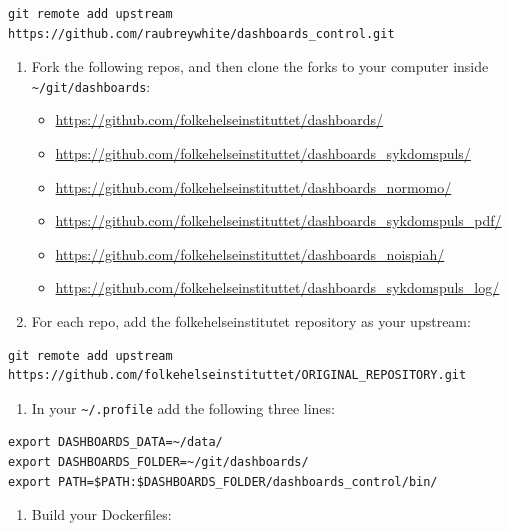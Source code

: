 \documentclass[12pt,]{article}
\providecommand{\tightlist}{%
  \setlength{\itemsep}{0pt}\setlength{\parskip}{0pt}}
\begin{document}
\begin{verbatim}
git remote add upstream https://github.com/raubreywhite/dashboards_control.git
\end{verbatim}

\begin{enumerate}
\def\labelenumi{\arabic{enumi}.}
\setcounter{enumi}{4}
\tightlist
\item
  Fork the following repos, and then clone the forks to your computer
  inside \texttt{\textasciitilde{}/git/dashboards}:

  \begin{itemize}
  \tightlist
  \item
    \url{https://github.com/folkehelseinstituttet/dashboards/}
  \item
    \url{https://github.com/folkehelseinstituttet/dashboards_sykdomspuls/}
  \item
    \url{https://github.com/folkehelseinstituttet/dashboards_normomo/}
  \item
    \url{https://github.com/folkehelseinstituttet/dashboards_sykdomspuls_pdf/}
  \item
    \url{https://github.com/folkehelseinstituttet/dashboards_noispiah/}
  \item
    \url{https://github.com/folkehelseinstituttet/dashboards_sykdomspuls_log/}
  \end{itemize}
\item
  For each repo, add the folkehelseinstitutet repository as your
  upstream:
\end{enumerate}

\begin{verbatim}
git remote add upstream https://github.com/folkehelseinstituttet/ORIGINAL_REPOSITORY.git
\end{verbatim}

\begin{enumerate}
\def\labelenumi{\arabic{enumi}.}
\setcounter{enumi}{6}
\tightlist
\item
  In your \texttt{\textasciitilde{}/.profile} add the following three
  lines:
\end{enumerate}

\begin{verbatim}
export DASHBOARDS_DATA=~/data/
export DASHBOARDS_FOLDER=~/git/dashboards/
export PATH=$PATH:$DASHBOARDS_FOLDER/dashboards_control/bin/
\end{verbatim}

\begin{enumerate}
\def\labelenumi{\arabic{enumi}.}
\setcounter{enumi}{7}
\tightlist
\item
  Build your Dockerfiles:
\end{enumerate}
\end{document}
